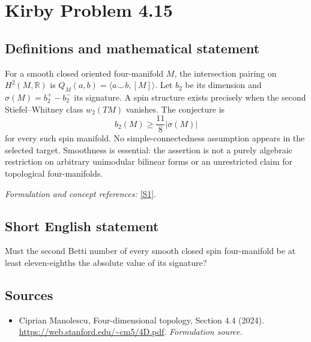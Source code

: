 \documentclass[11pt]{article}
\begin{document}
\section*{\texorpdfstring{Kirby Problem 4.15}{Kirby Problem 4.15}}\label{2891}
\subsection{Definitions and mathematical statement}
For a smooth closed oriented four-manifold $M$, the intersection pairing on
$H^2(M,{\mathbb{R}})$ is $Q_M(a,b)=\langle a\smile b,[M]\rangle$. Let $b_2$ be its dimension and $\sigma(M)=b_2^+-b_2^-$ its signature. A spin structure exists precisely when the second Stiefel--Whitney class $w_2(TM)$ vanishes. The conjecture is
\[
 b_2(M)\ge\frac{11}{8}|\sigma(M)|
\]
for every such spin manifold. No simple-connectedness assumption appears in the selected target. Smoothness is essential: the assertion is not a purely algebraic restriction on arbitrary unimodular bilinear forms or an unrestricted claim for topological four-manifolds.
\par\smallskip\textit{Formulation and concept references:} \href{https://web.stanford.edu/~cm5/4D.pdf}{[S1]}.

\subsection{Short English statement}
Must the second Betti number of every smooth closed spin four-manifold be at least eleven-eighths the absolute value of its signature?
\subsection{Sources}
\begin{itemize}
\item[S1]Ciprian Manolescu, Four-dimensional topology, Section 4.4 (2024).
\url{https://web.stanford.edu/~cm5/4D.pdf}.
\textit{Formulation source.}
\end{itemize}
\end{document}
